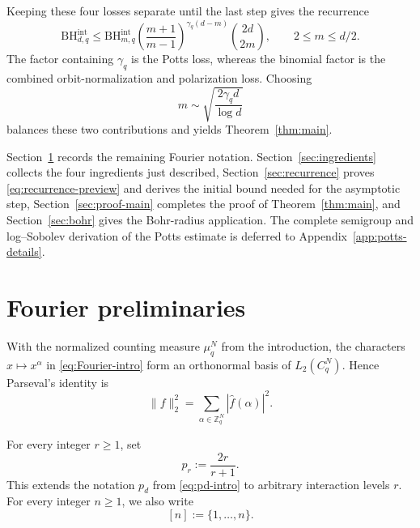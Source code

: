 \documentclass[11pt,a4paper]{article}
\numberwithin{equation}{section}
\theoremstyle{cleanplain}
\theoremstyle{cleandefinition}
\theoremstyle{cleanremark}
\newcommand{\BHint}[2]{\mathrm{BH}^{\mathrm{int}}_{#1,#2}}
\begin{document}
Keeping these four losses separate until the last step gives the recurrence
\begin{equation}\label{eq:recurrence-preview}
 \BHint{d}{q}\leq
 \BHint{m}{q}
 \left(\frac{m+1}{m-1}\right)^{\gamma_q(d-m)}
 \binom{2d}{2m},
 \qquad 2\leq m\leq d/2.
\end{equation}
The factor containing $\gamma_q$ is the Potts loss, whereas the binomial
factor is the combined orbit-normalization and polarization loss.  Choosing
\begin{equation}\label{eq:optimal-m-intro}
 m\sim\sqrt{\frac{2\gamma_q d}{\log d}}
\end{equation}
balances these two contributions and yields Theorem~\ref{thm:main}.

Section~\ref{sec:notation} records the remaining Fourier notation.
Section~\ref{sec:ingredients} collects the four ingredients just described,
Section~\ref{sec:recurrence} proves \eqref{eq:recurrence-preview} and derives
the initial bound needed for the asymptotic step,
Section~\ref{sec:proof-main} completes the proof of Theorem~\ref{thm:main},
and Section~\ref{sec:bohr} gives the Bohr-radius application.  The complete
semigroup and log--Sobolev derivation of the Potts estimate is deferred to
Appendix~\ref{app:potts-details}.

\section{Fourier preliminaries}\label{sec:notation}

With the normalized counting measure $\mu_q^N$ from the introduction, the
characters $x\mapsto x^\alpha$ in \eqref{eq:Fourier-intro} form an
orthonormal basis of $L_2(C_q^N)$.  Hence Parseval's identity is
{\color{black}
\begin{equation}\label{eq:parseval-cyclic}
 \|f\|_2^2=\sum_{\alpha\in\mathbb Z_q^N} |\widehat f(\alpha)|^2.
\end{equation}}

For every integer $r\geq1$, set
\begin{equation}\label{eq:pr}
 p_r:=\frac{2r}{r+1}.
\end{equation}
This extends the notation $p_d$ from \eqref{eq:pd-intro} to arbitrary
interaction levels $r$.  For every integer $n\geq1$, we also write
\begin{equation}\label{eq:bracket-n}
 [n]:=\{1,\ldots,n\}.
\end{equation}
\end{document}
